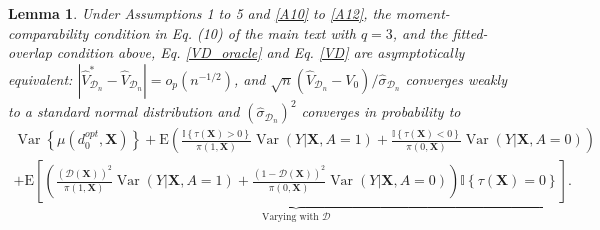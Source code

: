\documentclass[11pt]{article}
\theoremstyle{referenceplain}
\newtheorem{lemma}{Lemma}[section]
\theoremstyle{referencedefinition}
\theoremstyle{referenceremark}
\begin{document}
\begin{lemma}\label{single-lem}
 Under Assumptions 1 to 5 and \ref{A10} to \ref{A12}, the moment-comparability condition in Eq. (10) of the main text with $q=3$, {and the fitted-overlap condition above,} Eq. \eqref{VD_oracle} and Eq. \eqref{VD} are asymptotically equivalent: $|\widehat{V}_{\mathcal{D}_n}^* - \widehat{V}_{\mathcal{D}_n}|=o_p(n^{-1/2})$, and $\sqrt{n}(\widehat{V}_{\mathcal{D}_n}-V_0)/\widehat{\sigma}_{\mathcal{D}_n}$ converges weakly to a standard normal distribution and $(\widehat{\sigma}_{\mathcal{D}_n})^2$ converges in probability to
    \begin{align*}
          \operatorname{Var}\left\{\mu\left(d_0^{o p t}, \mathbf{X}\right)\right\}+ \mathrm{E}\left(\frac{\mathbb{I}\left\{\tau\left(\mathbf{X}\right)>0\right\}}{\pi\left(1, \mathbf{X}\right)}\operatorname{Var}(Y|\mathbf{X},A=1)+\frac{\mathbb{I}\left\{\tau\left(\mathbf{X}\right)<0\right\}}{\pi\left(0, \mathbf{X}\right)}\operatorname{Var}(Y|\mathbf{X},A=0)\right)\\
    +\underbrace{\mathrm{E}\left[\left(\frac{(\mathcal{D}(\mathbf{X}))^2}{\pi\left(1, \mathbf{X}\right)}\operatorname{Var}(Y|\mathbf{X},A=1)+\frac{(1-\mathcal{D}(\mathbf{X}))^2}{\pi\left(0, \mathbf{X}\right)}\operatorname{Var}(Y|\mathbf{X},A=0)\right) \mathbb{I}\left\{\tau\left(\mathbf{X}\right)=0\right\}\right]}_{\text{Varying with $\mathcal{D}$}}.
    \end{align*}
\end{lemma}
\end{document}
